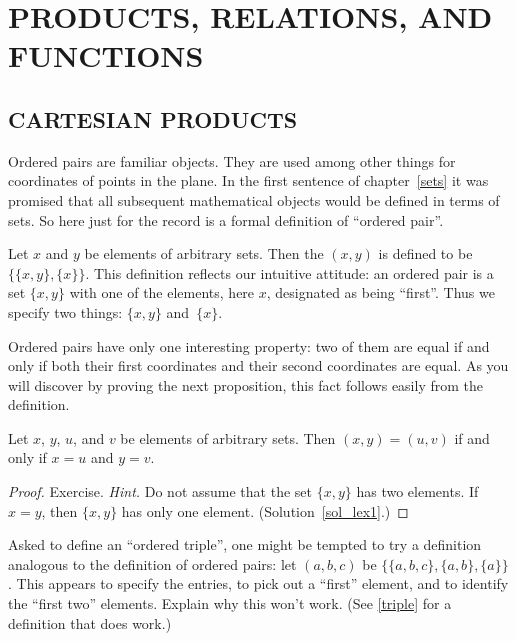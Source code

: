 \chapter{PRODUCTS, RELATIONS, AND FUNCTIONS}\label{fcns}

\section{CARTESIAN PRODUCTS}  Ordered pairs are familiar objects. They are used among other
things for coordinates of points in the plane.  In the first sentence of chapter~\ref{sets} it
was promised that all subsequent mathematical objects would be defined in terms of sets.  So
here just for the record is a formal definition of ``ordered pair''.

\begin{defn} Let $x$ and $y$ be elements of arbitrary sets.  Then the
 $(x,y)$ is defined to be $\{\{x,y\},\{x\}\}$.  This definition reflects our
intuitive attitude: an ordered pair is a set $\{x,y\}$ with one of the elements, here $x$,
designated as being ``first''.  Thus we specify two things: $\{x,y\}$ and~$\{x\}$.
\end{defn}

Ordered pairs have only one interesting property: two of them are equal if and only if both
their first coordinates and their second coordinates are equal. As you will discover by
proving the next proposition, this fact follows easily from the definition.

\begin{prop}\label{lex1} Let $x$, $y$, $u$, and $v$ be elements of arbitrary sets.  Then
$(x,y) = (u,v)$ if and only if $x = u$ and $y = v$.
\end{prop}

\begin{proof} Exercise. \emph{Hint.}  Do not assume that the set $\{x,y\}$ has two elements.
If $x = y$, then $\{x,y\}$ has only one element. (Solution~\ref{sol_lex1}.)  \ns
\end{proof}

\begin{prob} Asked to define an ``ordered triple'', one might be tempted to try a definition
analogous to the definition of ordered pairs: let $(a,b,c)$ be $\{\{a,b,c\},\{a,b\},\{a\}\}$.
This appears to specify the entries, to pick out a ``first'' element, and to identify the
``first two'' elements.  Explain why this won't work.  (See \ref{triple} for a definition that
does work.)
\end{prob}

